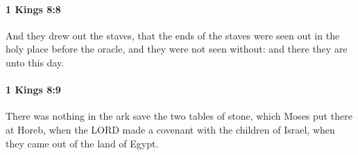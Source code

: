 		\paragraph{1 Kings 8:8} %
			\label{1KINGS-8-8}

			And they drew out the staves, that the ends of the staves were seen out in the holy place before the oracle, and they were not seen without: and there they are unto this day.


		\paragraph{1 Kings 8:9} %
			\label{1KINGS-8-9}

			There was nothing in the ark save the two tables of stone, which Moses put there at Horeb, when the LORD made a covenant with the children of Israel, when they came out of the land of Egypt.


